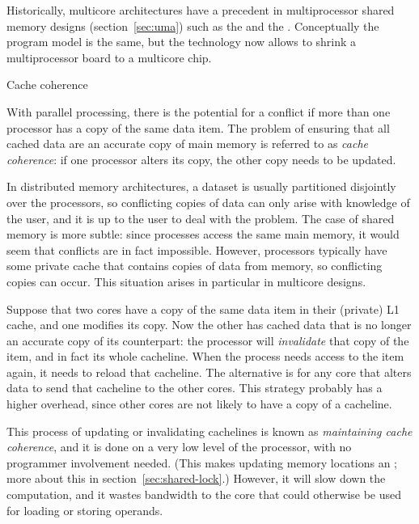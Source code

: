 Historically, multicore architectures have a precedent in
multiprocessor shared memory designs (section~\ref{sec:uma}) such as
the  and the . Conceptually the program model is the same, but the
technology now allows to shrink a multiprocessor board to a multicore
chip.

 {Cache coherence}
\label{sec:coherence}

With parallel processing, there is the potential for a conflict if more
than one processor has a copy of the same data item. The problem of
ensuring that all cached data are an accurate copy of main memory is
referred to as \emph{cache coherence}: if one processor alters
its copy, the other copy needs to be updated.

In distributed memory architectures, a dataset is usually partitioned
disjointly over the processors, so conflicting copies of data can only
arise with knowledge of the user, and it is up to the user to
deal with the problem. The case of shared memory is more subtle: since
processes access the same main memory, it would seem that conflicts
are in fact impossible. However, processors typically have some private
cache that contains copies of data from memory, so conflicting
copies can occur.  This situation arises in particular in multicore
designs.

Suppose that two cores have a copy of the same data item in their
(private) L1 cache, and one modifies its copy. Now the other has
cached data that is no longer an accurate copy of its counterpart: the
processor will \emph{invalidate} that
copy of the item, and in fact its whole cacheline. When the process
needs access to the item again, it needs to reload that cacheline.
The alternative is for any core that alters data to send that
cacheline to the other cores. This strategy probably has a higher overhead,
since other cores are not likely to have a copy of a cacheline.

This process of updating or invalidating cachelines
is known as \emph{maintaining cache coherence}, and it is done on
a very low level of the processor, with no programmer involvement
needed. (This makes updating memory locations an ; more about this in section~\ref{sec:shared-lock}.)
However, it will slow down the computation, and it wastes bandwidth to
the core that could otherwise be used for loading or storing operands.

